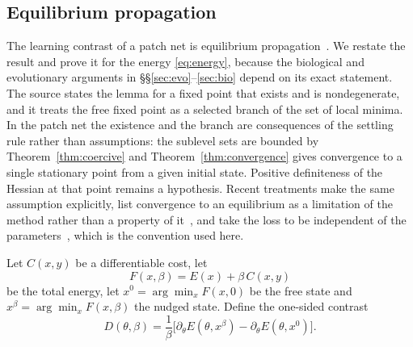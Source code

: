 \documentclass[11pt]{article}
\theoremstyle{definition}
\theoremstyle{remark}
\begin{document}
\subsection{Equilibrium propagation}
The learning contrast of a patch net is equilibrium propagation~\cite{scellier2017}. We restate the
result and prove it for the energy \eqref{eq:energy}, because the biological and evolutionary
arguments in \S\S\ref{sec:evo}--\ref{sec:bio} depend on its exact statement. The source states the
lemma for a fixed point that exists and is nondegenerate, and it treats the free fixed point as a
selected branch of the set of local minima. In the patch net the existence and the branch are
consequences of the settling rule rather than assumptions: the sublevel sets are bounded by
Theorem~\ref{thm:coercive} and Theorem~\ref{thm:convergence} gives convergence to a single stationary
point from a given initial state. Positive definiteness of the Hessian at that point remains a
hypothesis. Recent treatments make the same assumption explicitly, list convergence to an equilibrium
as a limitation of the method rather than a property of it~\cite{laborieux2024}, and take the loss to
be independent of the parameters~\cite{litman2025}, which is the convention used here.

Let $C(x,y)$ be a differentiable cost, let
\begin{equation}
F(x,\beta)=E(x)+\beta\,C(x,y)
\label{eq:total}
\end{equation}
be the total energy, let $x^0=\arg\min_x F(x,0)$ be the free state and
$x^\beta=\arg\min_x F(x,\beta)$ the nudged state. Define the one-sided contrast
\begin{equation}
D(\theta,\beta)=\frac1\beta\Big[\partial_\theta E(\theta,x^\beta)-\partial_\theta E(\theta,x^0)\Big].
\label{eq:contrast}
\end{equation}
\end{document}
